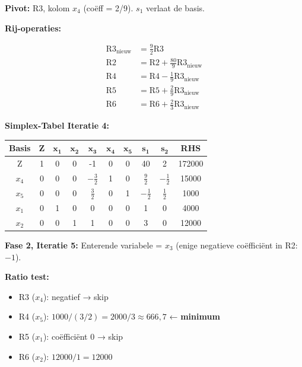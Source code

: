 \documentclass[a4paper,11pt]{article}
\begin{document}
\begin{oefenblok}
    \textbf{Pivot:} R3, kolom $x_4$ (coëff = 2/9). $s_1$ verlaat de basis.

    \textbf{Rij-operaties:}

    \begin{align*}
        \text{R3}_{\text{nieuw}} & = \frac{9}{2}\text{R3} \\
        \text{R2} & = \text{R2} + \frac{80}{9}\text{R3}_{\text{nieuw}} \\
        \text{R4} & = \text{R4} - \frac{1}{9}\text{R3}_{\text{nieuw}} \\
        \text{R5} & = \text{R5} + \frac{2}{9}\text{R3}_{\text{nieuw}} \\
        \text{R6} & = \text{R6} + \frac{2}{3}\text{R3}_{\text{nieuw}}
    \end{align*}

    \textbf{Simplex-Tabel Iteratie 4:}

    \begin{center}
        \footnotesize
        \setlength{\tabcolsep}{3pt}
        \begin{tabular}{|c|c|c|c|c|c|c|c|c|c|}
            \hline
            \textbf{Basis} & \textbf{Z} & $\mathbf{x_1}$ & $\mathbf{x_2}$ & $\mathbf{x_3}$ & $\mathbf{x_4}$ & $\mathbf{x_5}$ & $\mathbf{s_1}$ & $\mathbf{s_2}$ & \textbf{RHS} \\
            \hline
            Z & 1 & 0 & 0 & -1 & 0 & 0 & 40 & 2 & 172000 \\
            \hline
            $x_4$ & 0 & 0 & 0 & $-\frac{3}{2}$ & 1 & 0 & $\frac{9}{2}$ & $-\frac{1}{2}$ & 15000 \\
            \hline
            $x_5$ & 0 & 0 & 0 & $\frac{3}{2}$ & 0 & 1 & $-\frac{1}{2}$ & $\frac{1}{2}$ & 1000 \\
            \hline
            $x_1$ & 0 & 1 & 0 & 0 & 0 & 0 & 1 & 0 & 4000 \\
            \hline
            $x_2$ & 0 & 0 & 1 & 1 & 0 & 0 & 3 & 0 & 12000 \\
            \hline
        \end{tabular}
    \end{center}

    \textbf{Fase 2, Iteratie 5:} Enterende variabele = $x_3$ (enige negatieve coëfficiënt in R2: $-1$).

    \textbf{Ratio test:}
    \begin{itemize}
        \item R3 ($x_4$): negatief → skip
        \item R4 ($x_5$): $1000/(3/2) = 2000/3 \approx 666{,}7$ ← \textbf{minimum}
        \item R5 ($x_1$): coëfficiënt 0 → skip
        \item R6 ($x_2$): $12000/1 = 12000$
    \end{itemize}


\end{oefenblok}
\end{document}
